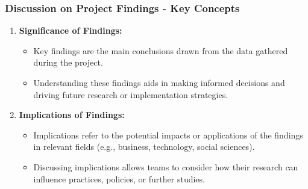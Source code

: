 \documentclass[aspectratio=169]{beamer}
\begin{document}
\begin{frame}[fragile]
    \frametitle{Discussion on Project Findings - Key Concepts}
    \begin{enumerate}
        \item \textbf{Significance of Findings:}
            \begin{itemize}
                \item Key findings are the main conclusions drawn from the data gathered during the project.
                \item Understanding these findings aids in making informed decisions and driving future research or implementation strategies.
            \end{itemize}
        
        \item \textbf{Implications of Findings:}
            \begin{itemize}
                \item Implications refer to the potential impacts or applications of the findings in relevant fields (e.g., business, technology, social sciences).
                \item Discussing implications allows teams to consider how their research can influence practices, policies, or further studies.
            \end{itemize}
    \end{enumerate}
\end{frame}
\end{document}
